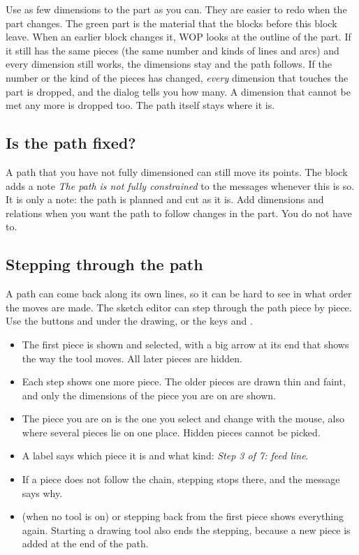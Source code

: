 \begin{warningbox}
Use as few dimensions to the part as you can. They are easier to redo when the part changes. The green part is the material that the blocks before this block leave. When an earlier block changes it, WOP looks at the outline of the part. If it still has the same pieces (the same number and kinds of lines and arcs) and every dimension still works, the dimensions stay and the path follows. If the number or the kind of the pieces has changed, \emph{every} dimension that touches the part is dropped, and the dialog tells you how many. A dimension that cannot be met any more is dropped too. The path itself stays where it is.
\end{warningbox}

\subsection{Is the path fixed?}
A path that you have not fully dimensioned can still move its points. The block adds a note \emph{The path is not fully constrained} to the messages whenever this is so. It is only a note: the path is planned and cut as it is. Add dimensions and relations when you want the path to follow changes in the part. You do not have to.

\subsection{Stepping through the path}\label{sec:blocks:pathstep}
A path can come back along its own lines, so it can be hard to see in what order the moves are made. The sketch editor can step through the path piece by piece. Use the buttons  and  under the drawing, or the keys  and .

\begin{itemize}
\item The first piece is shown and selected, with a big arrow at its end that shows the way the tool moves. All later pieces are hidden.
\item Each step shows one more piece. The older pieces are drawn thin and faint, and only the dimensions of the piece you are on are shown.
\item The piece you are on is the one you select and change with the mouse, also where several pieces lie on one place. Hidden pieces cannot be picked.
\item A label says which piece it is and what kind: \emph{Step 3 of 7: feed line}.
\item If a piece does not follow the chain, stepping stops there, and the message says why.
\item {} (when no tool is on) or stepping back from the first piece shows everything again. Starting a drawing tool also ends the stepping, because a new piece is added at the end of the path.
\end{itemize}

